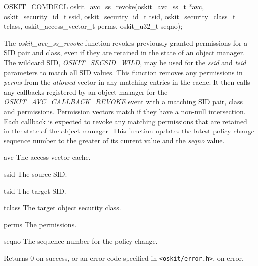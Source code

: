 \begin{apisyn}

	\funcproto OSKIT_COMDECL
	oskit_avc_ss_revoke(oskit_avc_ss_t *avc, 
		         oskit_security_id_t ssid,
			 oskit_security_id_t tsid,
                         oskit_security_class_t tclass,
			 oskit_access_vector_t perms,
			 oskit_u32_t seqno);
\end{apisyn}
\begin{apidesc}

The \emph{oskit\_avc\_ss\_revoke} function revokes previously granted
permissions for a SID pair and class, even if they are retained in the
state of an object manager.  The wildcard SID, \emph{OSKIT\_SECSID\_WILD},
may be used for the
\emph{ssid} and \emph{tsid} parameters to match all SID values.  This
function removes any permissions in \emph{perms} from the
\emph{allowed} vector in any matching entries in the cache.  It then
calls any callbacks registered by an object manager for the
\emph{OSKIT\_AVC\_CALLBACK\_REVOKE} event with a matching SID pair, class and
permissions.  Permission vectors match if they have a non-null
intersection.  Each callback is expected to revoke any matching
permissions that are retained in the state of the object manager.
This function updates the latest policy change sequence number to the
greater of its current value and the \emph{seqno} value.

\end{apidesc}
\begin{apiparm}
	\item[avc]
		The access vector cache.
	\item[ssid]
		The source SID.
	\item[tsid]
		The target SID.
	\item[tclass]
		The target object security class.
	\item[perms]
		The permissions.
	\item[seqno]
		The sequence number for the policy change.
\end{apiparm}
\begin{apiret}
	Returns 0 on success, or an error code specified in
	{\tt <oskit/error.h>}, on error.
\end{apiret}


